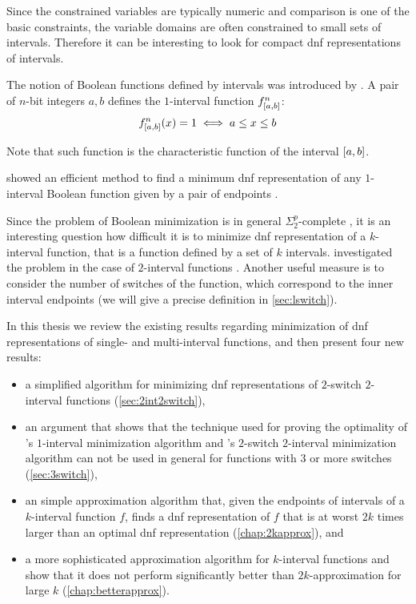 Since the constrained variables are typically numeric
and comparison is one of the basic constraints,
the variable domains are often constrained
to small sets of intervals.
Therefore it can be interesting to look
for compact \acrshort{dnf}
representations of intervals.

The notion of
Boolean functions defined by intervals was introduced
by \citet{Schieber2005154}.
A pair of $n$-bit integers $a, b$
defines the $1$-interval function
$f^{n}_{[a, b]}$:
$$
f^{n}_{[a, b]} (x) = 1
\iff a \leq x \leq b
$$

Note that such function
is the characteristic function of the interval
$[a, b]$.

\citeauthor{Schieber2005154} showed an efficient method
to find a minimum \acrfull{dnf} representation
of any $1$-interval Boolean function
given by a pair of endpoints \citep{Schieber2005154}.

Since the problem of Boolean minimization is in general
$\Sigma_2^p$-complete \citep{Umans1998},
it is an interesting question how difficult it is
to minimize \acrshort{dnf} representation of
a $k$-interval function,
that is a function defined by a set of $k$ intervals.
\citeauthor{Dubovsky2012} investigated the problem
in the case of $2$-interval functions
\citep{Dubovsky2012}.
Another useful measure
is to consider the number of switches of the function,
which correspond to the inner interval endpoints
(we will give a precise definition
in \cref{sec:lswitch}).

In this thesis we review the existing results regarding
minimization of \acrshort{dnf} representations of
single- and multi-interval functions,
and then present four new results:

\begin{itemize}
\item a simplified algorithm
for minimizing \acrshort{dnf} representations
of $2$-switch
$2$-interval functions (\cref{sec:2int2switch}),

\item
an argument that shows
that the technique used for proving the optimality
of \citeauthor{Schieber2005154}'s
$1$-interval minimization algorithm
\citep{Schieber2005154}
and \citeauthor{Dubovsky2012}'s
$2$-switch $2$-interval minimization algorithm
\citep{Dubovsky2012}
can not be used in general for
functions with $3$ or more switches
(\cref{sec:3switch}),

\item
an simple approximation algorithm that,
given the endpoints of intervals
of a $k$-interval function $f$,
finds a \acrshort{dnf} representation of $f$
that is at worst
$2k$ times larger
than an optimal \acrshort{dnf} representation
(\cref{chap:2kapprox}), and

\item
a more sophisticated approximation algorithm
for $k$-interval functions
and show that it does not perform significantly
better than $2k$-approximation for large $k$
(\cref{chap:betterapprox}).
\end{itemize}
